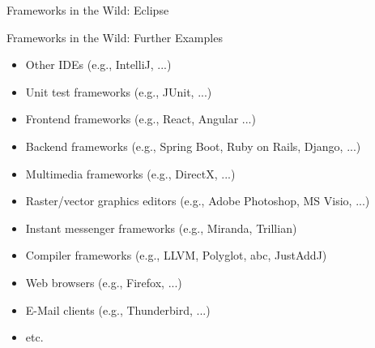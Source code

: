 \begin{frame}{Frameworks in the Wild: Eclipse \mytitlesource{\featureide}}
	\begin{mycolumns}%
	\mynextcolumn
	\end{mycolumns}
\end{frame}

\begin{frame}{Frameworks in the Wild: Further Examples}
	\begin{mycolumns}[columns=3,widths={15,70},animation=none]
	\mynextcolumn
		\begin{example}{}
			\begin{itemize}
				\item Other IDEs (e.g., IntelliJ, ...)
				\item Unit test frameworks (e.g., JUnit, ...)
				\item Frontend frameworks (e.g., React, Angular ...)
				\item Backend frameworks (e.g., Spring Boot, Ruby on Rails, Django, ...) 
				\item Multimedia frameworks (e.g., DirectX, ...)
				\item Raster/vector graphics editors (e.g., Adobe Photoshop, MS Visio, ...)
				\item Instant messenger frameworks (e.g., Miranda, Trillian)
				\item Compiler frameworks (e.g., LLVM, Polyglot, abc, JustAddJ)
				\item Web browsers (e.g., Firefox, ...)
				\item E-Mail clients (e.g., Thunderbird, ...)
				\item etc.
			\end{itemize}
		\end{example}		
	\mynextcolumn
	\end{mycolumns}
\end{frame}

